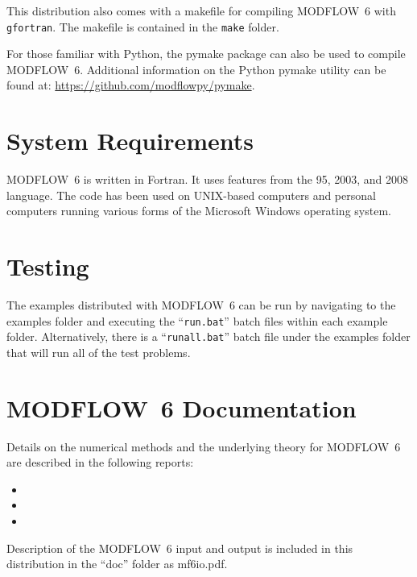 \documentclass[11pt,twoside,twocolumn]{usgsreport}
\begin{document}
This distribution also comes with a makefile for compiling MODFLOW~6 with \texttt{gfortran}.  The makefile is contained in the \texttt{make} folder.

For those familiar with Python, the pymake package can also be used to compile MODFLOW~6.  Additional information on the Python pymake utility can be found at: \url{https://github.com/modflowpy/pymake}.  

\section{System Requirements}
MODFLOW~6 is written in Fortran.  It uses features from the 95, 2003, and 2008 language.  The code has been used on UNIX-based computers and personal computers running various forms of the Microsoft Windows operating system.

\section{Testing}
The examples distributed with MODFLOW~6 can be run by navigating to the examples folder and executing the ``\texttt{run.bat}'' batch files within each example folder.  Alternatively, there is a ``\texttt{runall.bat}'' batch file under the examples folder that will run all of the test problems.

\section{MODFLOW~6 Documentation}
Details on the numerical methods and the underlying theory for MODFLOW~6 are described in the following reports:

\begin{itemize}

\item {}

\item {}

\item {}

\end{itemize}
 
\noindent Description of the MODFLOW~6 input and output is included in this distribution in the ``doc'' folder as mf6io.pdf.
\end{document}
